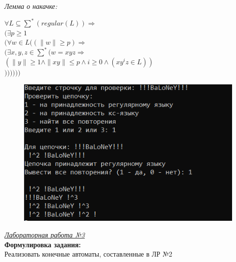 \documentclass[a4paper,10pt]{article}
\begin{document}
	\vspace*{5mm}
	\textit{Лемма о накачке:}
	\vspace*{5mm}
	\begin{center}
		$\forall L \subseteq \sum^{*} (regular(L)) \Rightarrow$ \\
		$( \exists p \ge 1 $ \\
		$(\forall w \in L ((\|w\| \ge p) \Rightarrow $ \\
		$( \exists x, y, z \in \sum^{*} (w = xyz \Rightarrow$ \\
		$(\|y\| \ge 1 \wedge \|xy\| \le p \wedge i \ge 0 \wedge (xy^{i}z \in L )) $ \\
		$)))))) $\\
	\end{center}
	\begin{figure}[h]
		\centering
		\includegraphics[]{2.png}
		\label{fig:mpr}
	\end{figure}
	\vspace*{5mm}
	
	\underline{\textit{Лабораторная работа №3}} \\[5mm]
	\textbf{Формулировка задания:} \\[3mm]
	\hspace*{5mm} Реализовать конечные автоматы, составленные в ЛР №2 \\
	
\end{document}
